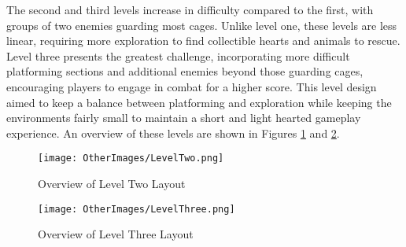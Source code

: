 \documentclass[10pt]{final_report}
\begin{document}
The second and third levels increase in difficulty compared to the first, with groups of two enemies guarding most cages. Unlike level one, these levels are less linear, requiring more exploration to find collectible hearts and animals to rescue. Level three presents the greatest challenge, incorporating more difficult platforming sections and additional enemies beyond those guarding cages, encouraging players to engage in combat for a higher score. This level design aimed to keep a balance between platforming and exploration while keeping the environments fairly small to maintain a short and light hearted gameplay experience. An overview of these levels are shown in Figures \ref{fig:label_LevelTwo} and \ref{fig:label_LevelThree}. \newline

\begin{figure}[H]
    \centering
    \texttt{[image: OtherImages/LevelTwo.png]}
    \caption{Overview of Level Two Layout}
    \label{fig:label_LevelTwo}
\end{figure}

\begin{figure}[H]
    \centering
    \texttt{[image: OtherImages/LevelThree.png]}
    \caption{Overview of Level Three Layout}
    \label{fig:label_LevelThree}
\end{figure}
\end{document}
